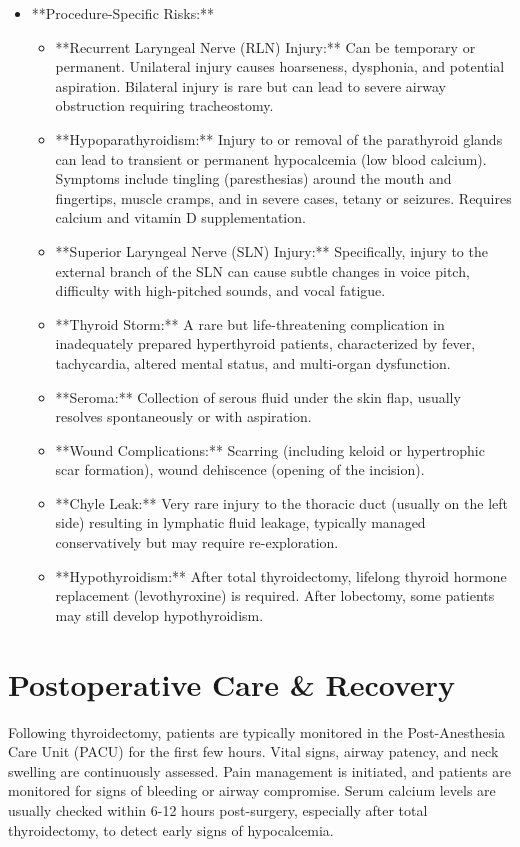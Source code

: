 \begin{itemize}
  \item **Procedure-Specific Risks:**
    \begin{itemize}
      \item **Recurrent Laryngeal Nerve (RLN) Injury:** Can be temporary or permanent. Unilateral injury causes hoarseness, dysphonia, and potential aspiration. Bilateral injury is rare but can lead to severe airway obstruction requiring tracheostomy.
      \item **Hypoparathyroidism:** Injury to or removal of the parathyroid glands can lead to transient or permanent hypocalcemia (low blood calcium). Symptoms include tingling (paresthesias) around the mouth and fingertips, muscle cramps, and in severe cases, tetany or seizures. Requires calcium and vitamin D supplementation.
      \item **Superior Laryngeal Nerve (SLN) Injury:** Specifically, injury to the external branch of the SLN can cause subtle changes in voice pitch, difficulty with high-pitched sounds, and vocal fatigue.
      \item **Thyroid Storm:** A rare but life-threatening complication in inadequately prepared hyperthyroid patients, characterized by fever, tachycardia, altered mental status, and multi-organ dysfunction.
      \item **Seroma:** Collection of serous fluid under the skin flap, usually resolves spontaneously or with aspiration.
      \item **Wound Complications:** Scarring (including keloid or hypertrophic scar formation), wound dehiscence (opening of the incision).
      \item **Chyle Leak:** Very rare injury to the thoracic duct (usually on the left side) resulting in lymphatic fluid leakage, typically managed conservatively but may require re-exploration.
      \item **Hypothyroidism:** After total thyroidectomy, lifelong thyroid hormone replacement (levothyroxine) is required. After lobectomy, some patients may still develop hypothyroidism.
    \end{itemize}
\end{itemize}

\section*{Postoperative Care \& Recovery}
Following thyroidectomy, patients are typically monitored in the Post-Anesthesia Care Unit (PACU) for the first few hours. Vital signs, airway patency, and neck swelling are continuously assessed. Pain management is initiated, and patients are monitored for signs of bleeding or airway compromise. Serum calcium levels are usually checked within 6-12 hours post-surgery, especially after total thyroidectomy, to detect early signs of hypocalcemia.

